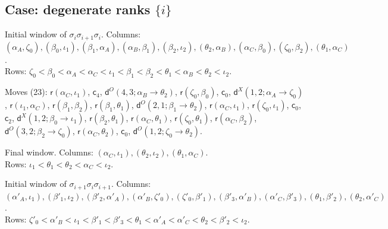 \documentclass[11pt]{amsart}
\theoremstyle{definition}
\theoremstyle{remark}
\begin{document}
\subsection*{Case: degenerate ranks \texorpdfstring{$\{i\}$}{i}}
\noindent Initial window of $\sigma_i\sigma_{i+1}\sigma_i$. Columns: $(\alpha_A,\zeta_0),\allowbreak (\beta_0,\iota_1),\allowbreak (\beta_1,\alpha_A),\allowbreak (\alpha_B,\beta_1),\allowbreak (\beta_2,\iota_2),\allowbreak (\theta_2,\alpha_B),\allowbreak (\alpha_C,\beta_0),\allowbreak (\zeta_0,\beta_2),\allowbreak (\theta_1,\alpha_C)$.\\ Rows: $\zeta_0 <\allowbreak \beta_0 <\allowbreak \alpha_A <\allowbreak \alpha_C <\allowbreak \iota_1 <\allowbreak \beta_1 <\allowbreak \beta_2 <\allowbreak \theta_1 <\allowbreak \alpha_B <\allowbreak \theta_2 <\allowbreak \iota_2$.\par
\noindent Moves (23): $\mathsf{r}(\alpha_C,\iota_1)$, $\mathsf{c}_{4}$, $\mathsf{d}^{O}(4,3;\alpha_B\to\theta_2)$, $\mathsf{r}(\zeta_0,\beta_0)$, $\mathsf{c}_{0}$, $\mathsf{d}^{X}(1,2;\alpha_A\to\zeta_0)$, $\mathsf{r}(\iota_1,\alpha_C)$, $\mathsf{r}(\beta_1,\beta_2)$, $\mathsf{r}(\beta_1,\theta_1)$, $\mathsf{d}^{O}(2,1;\beta_1\to\theta_2)$, $\mathsf{r}(\alpha_C,\iota_1)$, $\mathsf{r}(\zeta_0,\iota_1)$, $\mathsf{c}_{0}$, $\mathsf{c}_{2}$, $\mathsf{d}^{X}(1,2;\beta_0\to\iota_1)$, $\mathsf{r}(\beta_2,\theta_1)$, $\mathsf{r}(\alpha_C,\theta_1)$, $\mathsf{r}(\zeta_0,\theta_1)$, $\mathsf{r}(\alpha_C,\beta_2)$, $\mathsf{d}^{O}(3,2;\beta_2\to\zeta_0)$, $\mathsf{r}(\alpha_C,\theta_2)$, $\mathsf{c}_{0}$, $\mathsf{d}^{O}(1,2;\zeta_0\to\theta_2)$.\par
\noindent Final window. Columns: $(\alpha_C,\iota_1),\allowbreak (\theta_2,\iota_2),\allowbreak (\theta_1,\alpha_C)$.\\ Rows: $\iota_1 <\allowbreak \theta_1 <\allowbreak \theta_2 <\allowbreak \alpha_C <\allowbreak \iota_2$.\par\medskip
\noindent Initial window of $\sigma_{i+1}\sigma_i\sigma_{i+1}$. Columns: $(\alpha'_A,\iota_1),\allowbreak (\beta'_1,\iota_2),\allowbreak (\beta'_2,\alpha'_A),\allowbreak (\alpha'_B,\zeta'_0),\allowbreak (\zeta'_0,\beta'_1),\allowbreak (\beta'_3,\alpha'_B),\allowbreak (\alpha'_C,\beta'_3),\allowbreak (\theta_1,\beta'_2),\allowbreak (\theta_2,\alpha'_C)$.\\ Rows: $\zeta'_0 <\allowbreak \alpha'_B <\allowbreak \iota_1 <\allowbreak \beta'_1 <\allowbreak \beta'_3 <\allowbreak \theta_1 <\allowbreak \alpha'_A <\allowbreak \alpha'_C <\allowbreak \theta_2 <\allowbreak \beta'_2 <\allowbreak \iota_2$.\par
\end{document}
